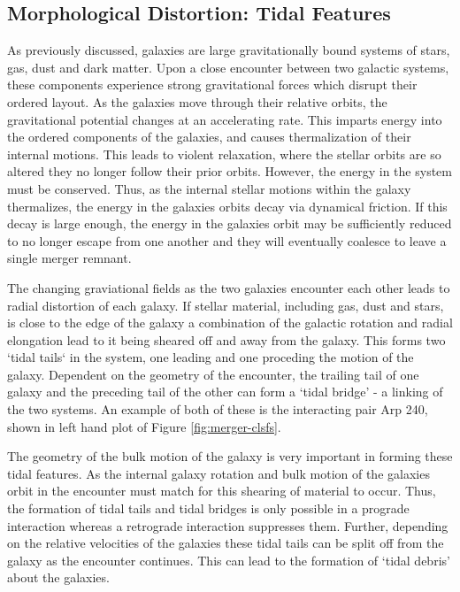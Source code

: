\subsection{Morphological Distortion: Tidal Features}
\noindent As previously discussed, galaxies are large gravitationally bound systems of stars, gas, dust and dark matter. Upon a close encounter between two galactic systems, these components experience strong gravitational forces which disrupt their ordered layout. As the galaxies move through their relative orbits, the gravitational potential changes at an accelerating rate. This imparts energy into the ordered components of the galaxies, and causes thermalization of their internal motions. This leads to violent relaxation, where the stellar orbits are so altered they no longer follow their prior orbits. However, the energy in the system must be conserved. Thus, as the internal stellar motions within the galaxy thermalizes, the energy in the galaxies orbits decay via dynamical friction. If this decay is large enough, the energy in the galaxies orbit may be sufficiently reduced to no longer escape from one another and they will eventually coalesce to leave a single merger remnant. 

The changing graviational fields as the two galaxies encounter each other leads to radial distortion of each galaxy. If stellar material, including gas, dust and stars, is close to the edge of the galaxy a combination of the galactic rotation and radial elongation lead to it being sheared off and away from the galaxy. This forms two `tidal tails` in the system, one leading and one proceding the motion of the galaxy. Dependent on the geometry of the encounter, the trailing tail of one galaxy and the preceding tail of the other can form a `tidal bridge' - a linking of the two systems. An example of both of these is the interacting pair Arp 240, shown in left hand plot of Figure \ref{fig:merger-clsfs}. 

The geometry of the bulk motion of the galaxy is very important in forming these tidal features. As the internal galaxy rotation and bulk motion of the galaxies orbit in the encounter must match for this shearing of material to occur. Thus, the formation of tidal tails and tidal bridges is only possible in a prograde interaction whereas a retrograde interaction suppresses them. Further, depending on the relative velocities of the galaxies these tidal tails can be split off from the galaxy as the encounter continues. This can lead to the formation of `tidal debris' about the galaxies.

